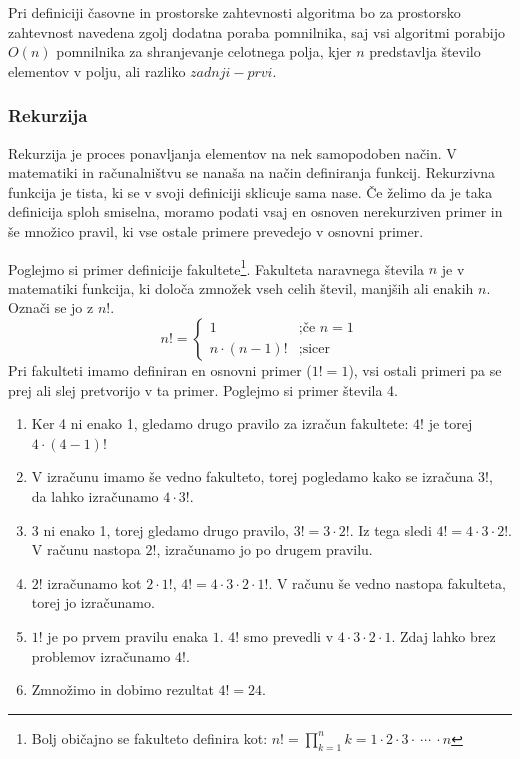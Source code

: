 \documentclass[a4paper,oneside,10pt]{article}
\begin{document}
Pri definiciji časovne in prostorske zahtevnosti algoritma bo za prostorsko zahtevnost 
navedena zgolj dodatna poraba pomnilnika, saj vsi algoritmi porabijo $O(n)$ pomnilnika za
shranjevanje celotnega polja, kjer $n$ predstavlja število elementov v polju, ali razliko
$zadnji - prvi$. 

\subsubsection{Rekurzija}
\label{chapter:rekurzija}
Rekurzija je proces ponavljanja elementov na nek samopodoben način. V matematiki in 
računalništvu se nanaša na način definiranja funkcij. Rekurzivna funkcija je tista, 
ki se v svoji definiciji sklicuje sama nase. Če želimo da je taka definicija sploh 
smiselna, moramo podati vsaj en osnoven nerekurziven primer in še množico pravil, 
ki vse ostale primere prevedejo v osnovni primer.

Poglejmo si primer definicije fakultete\footnote{Bolj običajno se fakulteto definira kot:
$n! = \displaystyle\prod_{k=1}^{n} k = 1 \cdot 2 \cdot 3 \cdot \ \cdots\  \cdot n$}. Fakulteta naravnega števila $n$ je v matematiki
funkcija, ki določa zmnožek vseh celih števil, manjših ali enakih $n$. Označi se jo z $n!$.
\[
n! = \left\{ 
\begin{array}{rl}
     1             & \mbox{;če $n = 1$} \\
     n \cdot (n-1)!& \mbox{;sicer}
\end{array} \right.
\]
Pri fakulteti imamo definiran en osnovni primer ($1! = 1$), vsi ostali primeri pa se prej
ali slej pretvorijo v ta primer. Poglejmo si primer števila 4.
\begin{enumerate}
  \item Ker 4 ni enako 1, gledamo drugo pravilo za izračun fakultete: $4!$ je torej $4
    \cdot (4 - 1)!$
  \item V izračunu imamo še vedno fakulteto, torej pogledamo kako se izračuna $3!$, da
    lahko izračunamo $4 \cdot 3!$.
  \item 3 ni enako 1, torej gledamo drugo pravilo, $3! = 3 \cdot 2!$. Iz tega sledi $4! =
    4 \cdot 3 \cdot 2!$. V računu nastopa $2!$, izračunamo jo po drugem pravilu.
  \item $2!$ izračunamo kot $2 \cdot 1!$, $4! = 4 \cdot 3 \cdot 2 \cdot 1!$. V računu še
    vedno nastopa fakulteta, torej jo izračunamo.
  \item $1!$ je po prvem pravilu enaka $1$. $4!$ smo prevedli v $4 \cdot 3 \cdot 2 \cdot
    1$. Zdaj lahko brez problemov izračunamo $4!$.
  \item Zmnožimo in dobimo rezultat $4! = 24$.
\end{enumerate}
\end{document}
